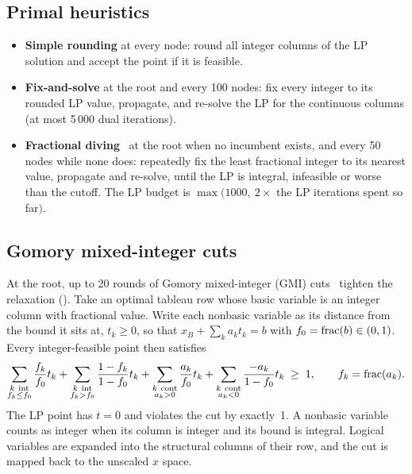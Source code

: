 \subsection{Primal heuristics}
\begin{itemize}
  \item \textbf{Simple rounding} at every node: round all integer columns of the LP solution and
        accept the point if it is feasible.
  \item \textbf{Fix-and-solve} at the root and every 100 nodes: fix every integer to its rounded
        LP value, propagate, and re-solve the LP for the continuous columns (at most 5\,000
        dual iterations).
  \item \textbf{Fractional diving}~\cite{berthold2006} at the root when no incumbent exists, and every
        50 nodes while none does: repeatedly fix the least fractional integer to its nearest value,
        propagate and re-solve, until the LP is integral, infeasible or worse than the cutoff. The
        LP budget is $\max(1000,\ 2\times$ the LP iterations spent so far$)$.
\end{itemize}

\subsection{Gomory mixed-integer cuts}\label{sec:gmi}
At the root, up to 20 rounds of Gomory mixed-integer (GMI) cuts~\cite{gomory1960,balas1996} tighten
the relaxation (). Take an optimal tableau row whose basic variable is an integer
column with fractional value. Write each nonbasic variable as its distance from the bound it sits
at, $t_k\ge0$, so that $x_B + \sum_k a_k t_k = b$ with $f_0=\operatorname{frac}(b)\in(0,1)$. Every integer-feasible
point then satisfies
\begin{equation}\label{eq:gmi}
  \sum_{\substack{k\ \text{int}\\ f_k\le f_0}}\frac{f_k}{f_0}t_k
  +\sum_{\substack{k\ \text{int}\\ f_k> f_0}}\frac{1-f_k}{1-f_0}t_k
  +\sum_{\substack{k\ \text{cont}\\ a_k>0}}\frac{a_k}{f_0}t_k
  +\sum_{\substack{k\ \text{cont}\\ a_k<0}}\frac{-a_k}{1-f_0}t_k \;\ge\; 1,
  \qquad f_k=\operatorname{frac}(a_k).
\end{equation}
The LP point has $t=0$ and violates the cut by exactly~1. A nonbasic variable counts as integer when its
column is integer and its bound is integral. Logical variables are expanded into the structural
columns of their row, and the cut is mapped back to the unscaled $x$ space.


